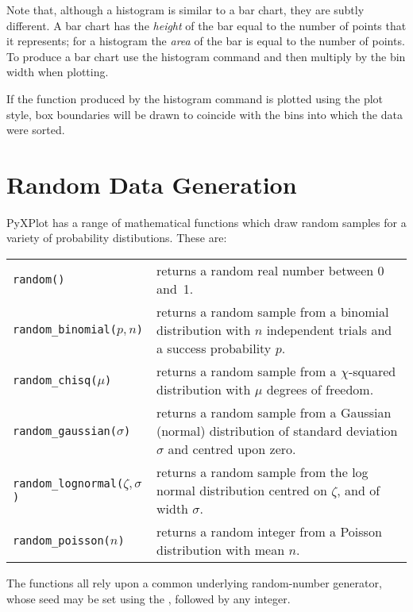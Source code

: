 Note that, although a histogram is similar to a bar chart, they are subtly
different.  A bar chart has the {\it height} of the bar equal to the number of
points that it represents; for a histogram the {\it area} of the bar is equal to
the number of points.  To produce a bar chart use the histogram
command and then multiply by the bin width when plotting.

If the function produced by the histogram command is plotted using the
 plot style, box boundaries will be drawn to coincide with the
bins into which the data were sorted.

\section{Random Data Generation}

PyXPlot has a range of mathematical functions which draw random samples for a
variety of probability distibutions. These are:

\vspace{2mm}
\noindent
\begin{tabular}{lp{7.5cm}}
{\tt random()} & returns a random real number between 0 and~1. \\
{\tt random\_binomial($p,n$)} & returns a random sample from a binomial distribution with $n$ independent trials and a success probability $p$. \\
{\tt random\_chisq($\mu$)} & returns a random sample from a $\chi$-squared distribution with $\mu$ degrees of freedom. \\
{\tt random\_gaussian($\sigma$)} & returns a random sample from a Gaussian (normal) distribution of standard deviation $\sigma$ and centred upon zero. \\
{\tt random\_lognormal($\zeta,\sigma$)} & returns a random sample from the log normal distribution centred on $\zeta$, and of width $\sigma$. \\
{\tt random\_poisson($n$)} & returns a random integer from a Poisson distribution with mean $n$. \\
\end{tabular}
\vspace{2mm}

\noindent The functions all rely upon a common underlying random-number
generator, whose seed may be set using the , followed by any
integer.

